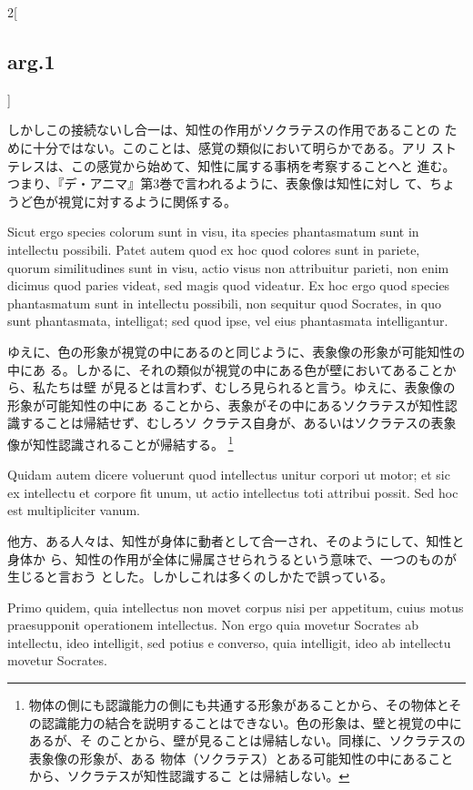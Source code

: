 \documentclass[paper=a4paper,fontsize=10pt,jafontsize=9pt,titlepage]{jlreq}
\begin{document}
\begin{paracol}{2}[\subsection{arg.1}]
\switchcolumn

 しかしこの接続ないし合一は、知性の作用がソクラテスの作用であることの
 ために十分ではない。このことは、感覚の類似において明らかである。アリ
 ストテレスは、この感覚から始めて、知性に属する事柄を考察することへと
 進む。つまり、『デ・アニマ』第3巻で言われるように、表象像は知性に対し
 て、ちょうど色が視覚に対するように関係する。
 
\switchcolumn*


 Sicut ergo species colorum sunt in visu, ita species phantasmatum sunt in
 intellectu possibili. Patet autem quod ex hoc quod colores sunt in pariete,
 quorum similitudines sunt in visu, actio visus non attribuitur parieti, non
 enim dicimus quod paries videat, sed magis quod videatur. Ex hoc ergo quod
 species phantasmatum sunt in intellectu possibili, non sequitur quod Socrates,
 in quo sunt phantasmata, intelligat; sed quod ipse, vel eius phantasmata
 intelligantur.
 
 \switchcolumn

 ゆえに、色の形象が視覚の中にあるのと同じように、表象像の形象が可能知性の中にあ
 る。しかるに、それの類似が視覚の中にある色が壁においてあることから、私たちは壁
 が見るとは言わず、むしろ見られると言う。ゆえに、表象像の形象が可能知性の中にあ
 ることから、表象がその中にあるソクラテスが知性認識することは帰結せず、むしろソ
 クラテス自身が、あるいはソクラテスの表象像が知性認識されることが帰結する。
 \footnote{物体の側にも認識能力の側にも共通する形象があることから、その物体とそ
 の認識能力の結合を説明することはできない。色の形象は、壁と視覚の中にあるが、そ
 のことから、壁が見ることは帰結しない。同様に、ソクラテスの表象像の形象が、ある
 物体（ソクラテス）とある可能知性の中にあることから、ソクラテスが知性認識するこ
 とは帰結しない。}

\switchcolumn*

 Quidam autem dicere voluerunt quod intellectus unitur corpori ut motor; et sic
 ex intellectu et corpore fit unum, ut actio intellectus toti attribui
 possit. Sed hoc est multipliciter vanum.
 
\switchcolumn

 他方、ある人々は、知性が身体に動者として合一され、そのようにして、知性と身体か
 ら、知性の作用が全体に帰属させられうるという意味で、一つのものが生じると言おう
 とした。しかしこれは多くのしかたで誤っている。
 
\switchcolumn*


 Primo quidem, quia intellectus non movet corpus nisi per appetitum, cuius motus
 praesupponit operationem intellectus. Non ergo quia movetur Socrates ab
 intellectu, ideo intelligit, sed potius e converso, quia intelligit, ideo ab
 intellectu movetur Socrates.
 

\end{paracol}
\end{document}
